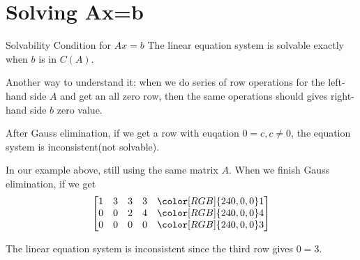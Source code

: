 \documentclass{beamer}
\begin{document}
\section{Solving Ax=b}
\begin{frame}{Solvability Condition for $Ax=b$}
The linear equation system is solvable exactly when $b$ is in $C(A)$.

\vspace{3pt}
Another way to understand it: when we do series of row operations for the left-hand side $A$ and get an all zero row, then the same operations should gives right-hand side $b$ zero value.

\vspace{3pt}
After Gauss elimination, if we get a row with euqation $0=c, c\ne0$, the equation system is \alert{inconsistent}(not solvable).

\vspace{3pt}
In our example above, still using the same matrix $A$. When we finish Gauss elimination, if we get
\begin{equation*}
    \left[ \begin{matrix}
        1&		3&		3&		3&		{\color[RGB]{240, 0, 0} 1}\\
        0&		0&		2&		4&		{\color[RGB]{240, 0, 0} 4}\\
        0&		0&		0&		0&		{\color[RGB]{240, 0, 0} 3}\\
    \end{matrix} \right]
\end{equation*}

The linear equation system is inconsistent since the third row gives $0=3$.
\end{frame}
\end{document}
